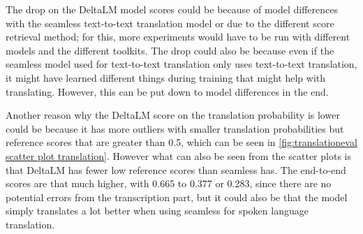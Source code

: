 The drop on the DeltaLM model scores could be because of model differences with the seamless text-to-text translation model or due to the different score retrieval method; for this, more experiments would have to be run with different models and the different toolkits. 
The drop could also be because even if the seamless model used for text-to-text translation only uses text-to-text translation, it might have learned different things during training that might help with translating. However, this can be put down to model differences in the end. 

Another reason why the DeltaLM score on the translation probability is lower could be because it has more outliers with smaller translation probabilities but reference scores that are greater than 0.5, which can be seen in \autoref{fig:translationeval scatter plot translation}. However what can also be seen from the scatter plots is that DeltaLM has fewer low reference scores than seamless has. 
The end-to-end scores are that much higher, with 0.665 to 0.377 or 0.283, since there are no potential errors from the transcription part, but it could also be that the model simply translates a lot better when using seamless for spoken language translation. 

